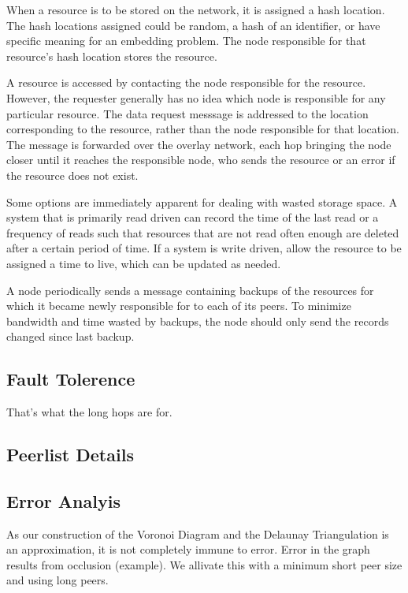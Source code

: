 \documentclass{IEEEtran}
\begin{document}
When a resource is to be stored on the network, it is assigned a hash location. The hash locations assigned could be random, a hash of an identifier, or have specific meaning for an embedding problem. The node responsible for that resource's hash location stores the resource.

A resource is accessed by contacting the node responsible for the resource.  However, the requester generally has no idea which node is responsible for any particular resource.  The data request messsage is addressed to the location corresponding to the resource, rather than the node responsible for that location.  The message is forwarded over the overlay network, each hop bringing the node closer until it reaches the responsible node, who sends the resource or an error if the resource does not exist.

Some options are immediately apparent for dealing with wasted storage space. A system that is primarily read driven can record the time of the last read or a frequency of reads such that resources that are not read often enough are deleted after a certain period of time. If a system is write driven, allow the resource to be assigned a time to live, which can be updated as needed.

A node periodically sends a message containing backups of the resources for which it became newly responsible for to each of its peers. To minimize bandwidth and time wasted by backups, the node should only send the records changed since last backup.


\subsection*{Fault Tolerence}
That's what the long hops are for.

\subsection{Peerlist Details}



\subsection{Error Analyis}
As our construction of the Voronoi Diagram and the Delaunay Triangulation is an approximation, it is not completely immune to error. Error in the graph results from occlusion (example).  We allivate this with a minimum short peer size and using long peers.
\end{document}
